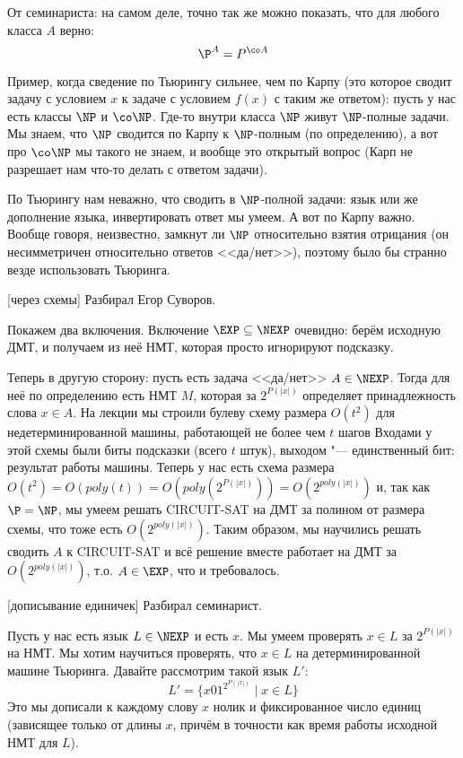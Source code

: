 	\begin{Rem}
		От семинариста: на самом деле, точно так же можно показать, что для любого
		класса $A$ верно:
		\[ \P^A = P^{\co A} \]
	\end{Rem}
	\begin{Rem}\label{task_14_rem_turing}
		Пример, когда сведение по Тьюрингу сильнее, чем по Карпу (это которое сводит задачу
		с условием $x$ к задаче с условием $f(x)$ с таким же ответом):
		пусть у нас есть классы $\NP$ и $\co\NP$.
		Где-то внутри класса $\NP$ живут $\NP$-полные задачи.
		Мы знаем, что $\NP$ сводится по Карпу к $\NP$-полным (по определению),
		а вот про $\co\NP$ мы такого не знаем, и вообще это открытый вопрос (Карп не разрешает нам что-то делать
		с ответом задачи).

		По Тьюрингу нам неважно, что сводить в $\NP$-полной задачи: язык или же дополнение языка,
		инвертировать ответ мы умеем.
		А вот по Карпу важно.
		Вообще говоря, неизвестно, замкнут ли $\NP$ относительно взятия отрицания (он несимметричен относительно
		ответов <<да/нет>>), поэтому было бы странно везде использовать Тьюринга.
	\end{Rem}

[через схемы]
	Разбирал Егор Суворов.

	Покажем два включения.
	Включение $\EXP \subseteq \NEXP$ очевидно: берём исходную ДМТ, и получаем
	из неё НМТ, которая просто игнорируют подсказку.

	Теперь в другую сторону: пусть есть задача <<да/нет>> $A \in \NEXP$.
	Тогда для неё по определению есть НМТ $M$, которая за $2^{P(|x|)}$ определяет
	принадлежность слова $x \in A$.
	На лекции мы строили булеву схему размера $O(t^2)$ для недетерминированной машины, работающей не более чем $t$ шагов
	Входами у этой схемы были биты подсказки (всего $t$ штук), выходом "--- единственный бит: результат работы машины.
	Теперь у нас есть схема размера $O(t^2)=O(poly(t))=O(poly(2^{P(|x|)}))=O(2^{poly(|x|)})$ и,
	так как $\P=\NP$, мы умеем решать CIRCUIT-SAT на ДМТ за полином от размера схемы, что тоже есть $O(2^{poly(|x|)})$.
	Таким образом, мы научились решать сводить $A$ к CIRCUIT-SAT и всё решение вместе работает на ДМТ
	за $O(2^{poly(|x|)})$, т.о. $A \in \EXP$, что и требовалось.

[дописывание единичек]\label{prob13_sol2}
	Разбирал семинарист.

	Пусть у нас есть язык $L \in \NEXP$ и есть $x$.
	Мы умеем проверять $x \in L$ за $2^{P(|x|)}$ на НМТ.
	Мы хотим научиться проверять, что $x\in L$ на детерминированной машине Тьюринга.
	Давайте рассмотрим такой язык $L'$:
	\[ L' = \{ x 0 1^{2^{P(|x|)}} \mid x \in L \} \]
	Это мы дописали к каждому слову $x$ нолик и фиксированное число единиц (зависящее только от длины $x$,
	причём в точности как время работы исходной НМТ для $L$).


